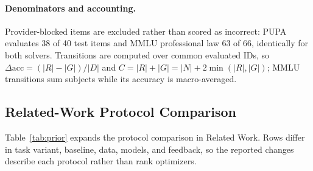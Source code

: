 \documentclass[10pt]{article} %
\begin{document}
\paragraph{Denominators and accounting.}
Provider-blocked items are excluded rather than scored as incorrect: PUPA evaluates 38 of 40 test items and MMLU
professional law 63 of 66, identically for both solvers. Transitions are computed over common evaluated IDs, so
$\Delta\mathrm{acc}=(|R|-|G|)/|D|$ and $C=|R|+|G|=|N|+2\min(|R|,|G|)$; MMLU transitions sum subjects while its
accuracy is macro-averaged.

\subsection{Related-Work Protocol Comparison}
\label{app:prior}
Table~\ref{tab:prior} expands the protocol comparison in Related Work. Rows differ in task variant, baseline, data,
models, and feedback, so the reported changes describe each protocol rather than rank optimizers.
\end{document}
